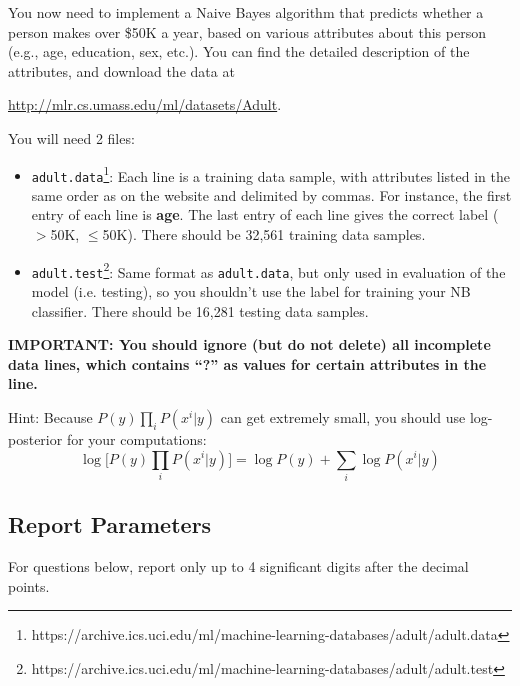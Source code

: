 \documentclass{article}
\begin{document}
You now need to implement a Naive Bayes algorithm that predicts whether a person makes over \$50K a year, based on various attributes about this person (e.g., age, education, sex, etc.). You can find the detailed description of the attributes, and download the data at 
\begin{center}
\url{http://mlr.cs.umass.edu/ml/datasets/Adult}.
\end{center}
You will need 2 files:
\begin{itemize}
\item \texttt{adult.data}\footnote{https://archive.ics.uci.edu/ml/machine-learning-databases/adult/adult.data}: Each line is a training data sample, with attributes listed in the same order as on the website and delimited by commas. For instance, the first entry of each line is \textbf{age}. The last entry of each line gives the correct label ($>$50K, $\leq$50K). There should be 32,561 training data samples.
\item \texttt{adult.test}\footnote{https://archive.ics.uci.edu/ml/machine-learning-databases/adult/adult.test}: Same format as \texttt{adult.data}, but only used in evaluation of the model (i.e. testing), so you shouldn't use the label for training your NB classifier. There should be 16,281 testing data samples.
\end{itemize}
\textbf{IMPORTANT: You should ignore (but do not delete) all incomplete data lines, which contains ``?'' as values for certain attributes in the line.}

Hint: Because $P(y)\prod_i P(x^i|y)$ can get extremely small, you should use log-posterior for your computations:
$$
\log \bigg[P(y)\prod_i P(x^i|y)\bigg] = \log P(y) + \sum_i \log P(x^i|y)
$$

\subsection{Report Parameters}

For questions below, report only up to 4 significant digits after the decimal points.
\end{document}
